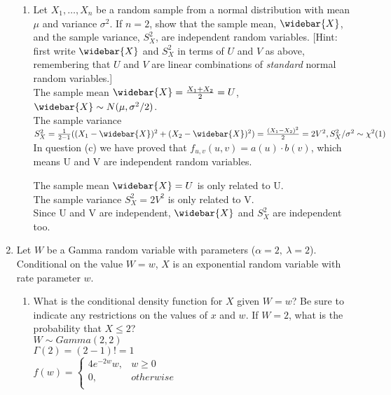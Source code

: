\documentclass[11pt]{article}
\begin{document}
\begin{enumerate}[label=\textbf{Question \arabic*:},start=1]
\begin{enumerate}
  \item Let $X_1,\ldots,X_n$ be a random sample from a normal distribution with mean $\mu$ and variance $\sigma^2$. If $n=2$, show that the sample mean, $\widebar{X}$, and the sample variance, $S_X^2$, are independent random variables. [Hint: first write $\widebar{X}$ and $S_X^2$ in terms of $U$ and $V$ as above, remembering that $U$ and $V$ are linear combinations of {\em standard} normal random variables.]\\
  
  The sample mean $\widebar{X} = \frac{X_1 + X_2}{2} = U $, $\widebar{X} \sim N(\mu, \sigma^2 / 2)$.\\
  The sample variance $S_X^2 = \frac{1}{2-1} ((X_1 - \widebar{X})^2 + (X_2 - \widebar{X})^2) = \frac{(X_1-X_2)^2}{2} = 2 V^2, S_X^2/\sigma^2 \sim \chi^2(1)$\\
  
  In question (c) we have proved that $f_{u,v}(u,v) = a(u) \cdot b(v)$, which means U and V are independent random variables.
  
  The sample mean $\widebar{X} = U$ is only related to U.\\
  The sample variance $S_X^2 = 2 V^2$ is only related to V.\\
  Since U and V are independent, $\widebar{X}$ and $S_X^2$ are independent too.
  
\end{enumerate}




\vspace*{3mm}

\item Let $W$ be a Gamma random variable with parameters ($\alpha = 2,\ \lambda = 2$). Conditional on the value $W = w$, $X$ is an exponential random variable with rate parameter $w$.
\begin{enumerate}
\item What is the conditional density function for $X$ given $W = w$? Be sure to indicate any restrictions on the values of $x$ and $w$. If $W=2$, what is the probability that $X\leq 2$?\\

$W \sim Gamma(2, 2)$ \\
$\Gamma(2) = (2-1)! = 1$ \\
$f(w) = \begin{cases}
		4 e^{-2w} w, & w \geq 0 \\ 
		0, & otherwise\\
		\end{cases}$\\
		

\end{enumerate}
\end{enumerate}
\end{document}
